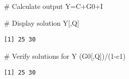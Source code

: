 \documentclass[
  letterpaper,
  DIV=11,
  numbers=noendperiod]{scrreprt}
\newenvironment{Shaded}{\begin{snugshade}}{\end{snugshade}}
\newcommand{\CommentTok}[1]{\textcolor[rgb]{0.37,0.37,0.37}{#1}}
\newcommand{\DecValTok}[1]{\textcolor[rgb]{0.68,0.00,0.00}{#1}}
\newcommand{\NormalTok}[1]{\textcolor[rgb]{0.00,0.23,0.31}{#1}}
\newcommand{\OtherTok}[1]{\textcolor[rgb]{0.00,0.23,0.31}{#1}}
\newcommand{\SpecialCharTok}[1]{\textcolor[rgb]{0.37,0.37,0.37}{#1}}
\begin{document}
\begin{Shaded}
\begin{Highlighting}[]
\CommentTok{\# Calculate output}
\NormalTok{Y}\OtherTok{=}\NormalTok{C}\SpecialCharTok{+}\NormalTok{G0}\SpecialCharTok{+}\NormalTok{I}

\CommentTok{\# Display solution}
\NormalTok{Y[,Q]}
\end{Highlighting}
\end{Shaded}

\begin{verbatim}
[1] 25 30
\end{verbatim}

\begin{Shaded}
\begin{Highlighting}[]
\CommentTok{\# Verify solutions for Y}
\NormalTok{(G0[,Q])}\SpecialCharTok{/}\NormalTok{(}\DecValTok{1}\SpecialCharTok{{-}}\NormalTok{c1)}
\end{Highlighting}
\end{Shaded}

\begin{verbatim}
[1] 25 30
\end{verbatim}
\end{document}
